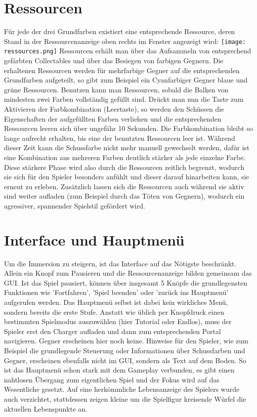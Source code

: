 \documentclass[a4paper,10pt,ngerman,fontsize=12pt]{scrreprt}
\begin{document}
\section{Ressourcen}

Für jede der drei Grundfarben existiert eine entsprechende Ressource, deren Stand in der Ressourcenanzeige oben rechts im Fenster angezeigt wird:
\texttt{[image: ressources.png]}
Ressourcen erhält man über das Aufsammeln von entsprechend gefärbten Collectables und über das Besiegen von farbigen Gegnern. Die erhaltenen Ressourcen werden für mehrfarbige Gegner auf die entsprechenden Grundfarben aufgeteilt, so gibt zum Beispiel ein Cyanfarbiger Gegner blaue und grüne Ressourcen.
Benutzen kann man Ressourcen, sobald die Balken von mindesten zwei Farben vollständig gefüllt sind. Drückt man nun die Taste zum Aktivieren der Farbkombination (Leertaste), so werden den Schüssen die Eigenschaften der aufgefüllten Farben verliehen und die entsprechenden Ressourcen leeren sich über ungefähr 10 Sekunden. Die Farbkombination bleibt so lange aufrecht erhalten, bis eine der benutzten Ressourcen leer ist. Während dieser Zeit kann die Schussfarbe nicht mehr manuell gewechselt werden, dafür ist eine Kombination aus mehreren Farben deutlich stärker als jede einzelne Farbe.
Diese stärkere Phase wird also durch die Ressourcen zeitlich begrenzt, wodurch sie sich für den Spieler besonders anfühlt und dieser darauf hinarbeiten kann, sie erneut zu erleben. Zusätzlich lassen sich die Ressourcen auch während sie aktiv sind weiter aufladen (zum Beispiel durch das Töten von Gegnern), wodurch ein agressiver, spannender Spielstil gefördert wird.



\section{Interface und Hauptmenü}

Um die Immersion zu steigern, ist das Interface auf das Nötigste beschränkt. Allein ein Knopf zum Pausieren und die Ressourcenanzeige bilden gemeinsam das GUI. Ist das Spiel pausiert, können über insgesamt 5 Knöpfe die grundlegensten Funktionen wie 'Fortfahren', 'Spiel beenden' oder 'zurück ins Hauptmenü'  aufgerufen werden. 
Das Hauptmenü selbst ist dabei kein wirkliches Menü, sondern bereits die erste Stufe. Anstatt wie üblich per Knopfdruck einen bestimmten Spielmodus auszuwählen (hier Tutorial oder Endlos), muss der Spieler erst den Charger aufladen und dann zum entsprechenden Portal navigieren. Gegner erscheinen hier noch keine. Hinweise für den Spieler, wie zum Beispiel die grundlegende Steuerung oder Informationen über Schussfarben und Gegner, erscheinen ebenfalls nicht im GUI, sondern als Text auf dem Boden. 
So ist das Hauptmenü schon stark mit dem Gameplay verbunden, es gibt einen nahtlosen Übergang zum eigentlichen Spiel und der Fokus wird auf das Wesentliche gesetzt.
Auf eine herkömmliche Lebensanzeige des Spielers wurde auch verzichtet, stattdessen zeigen kleine um die Spielfigur kreisende Würfel die aktuellen Lebenspunkte an.
\end{document}
